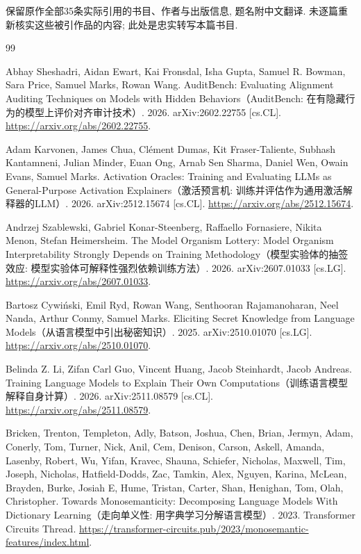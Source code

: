 \label{chive-references}

保留原作全部35条实际引用的书目、作者与出版信息, 题名附中文翻译. 未逐篇重新核实这些被引作品的内容; 此处是忠实转写本篇书目.

\begin{thebibliography}{99}

 Abhay Sheshadri, Aidan Ewart, Kai Fronsdal, Isha Gupta, Samuel R. Bowman, Sara Price, Samuel Marks, Rowan Wang. AuditBench: Evaluating Alignment Auditing Techniques on Models with Hidden Behaviors（AuditBench: 在有隐藏行为的模型上评价对齐审计技术）. 2026. arXiv:2602.22755 [cs.CL]. \url{https://arxiv.org/abs/2602.22755}.

 Adam Karvonen, James Chua, Clément Dumas, Kit Fraser-Taliente, Subhash Kantamneni, Julian Minder, Euan Ong, Arnab Sen Sharma, Daniel Wen, Owain Evans, Samuel Marks. Activation Oracles: Training and Evaluating LLMs as General-Purpose Activation Explainers（激活预言机: 训练并评估作为通用激活解释器的LLM）. 2026. arXiv:2512.15674 [cs.CL]. \url{https://arxiv.org/abs/2512.15674}.

 Andrzej Szablewski, Gabriel Konar-Steenberg, Raffaello Fornasiere, Nikita Menon, Stefan Heimersheim. The Model Organism Lottery: Model Organism Interpretability Strongly Depends on Training Methodology（模型实验体的抽签效应: 模型实验体可解释性强烈依赖训练方法）. 2026. arXiv:2607.01033 [cs.LG]. \url{https://arxiv.org/abs/2607.01033}.

 Bartosz Cywiński, Emil Ryd, Rowan Wang, Senthooran Rajamanoharan, Neel Nanda, Arthur Conmy, Samuel Marks. Eliciting Secret Knowledge from Language Models（从语言模型中引出秘密知识）. 2025. arXiv:2510.01070 [cs.LG]. \url{https://arxiv.org/abs/2510.01070}.

 Belinda Z. Li, Zifan Carl Guo, Vincent Huang, Jacob Steinhardt, Jacob Andreas. Training Language Models to Explain Their Own Computations（训练语言模型解释自身计算）. 2026. arXiv:2511.08579 [cs.CL]. \url{https://arxiv.org/abs/2511.08579}.

 Bricken, Trenton, Templeton, Adly, Batson, Joshua, Chen, Brian, Jermyn, Adam, Conerly, Tom, Turner, Nick, Anil, Cem, Denison, Carson, Askell, Amanda, Lasenby, Robert, Wu, Yifan, Kravec, Shauna, Schiefer, Nicholas, Maxwell, Tim, Joseph, Nicholas, Hatfield-Dodds, Zac, Tamkin, Alex, Nguyen, Karina, McLean, Brayden, Burke, Josiah E, Hume, Tristan, Carter, Shan, Henighan, Tom, Olah, Christopher. Towards Monosemanticity: Decomposing Language Models With Dictionary Learning（走向单义性: 用字典学习分解语言模型）. 2023. Transformer Circuits Thread. \url{https://transformer-circuits.pub/2023/monosemantic-features/index.html}. 


\end{thebibliography}
